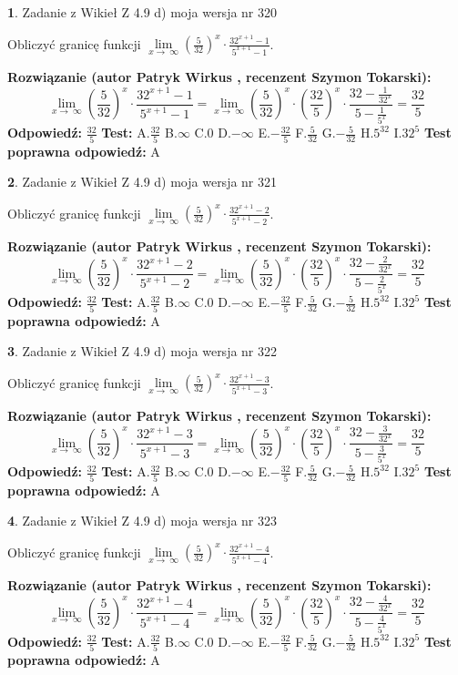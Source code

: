 \documentclass[12pt, a4paper]{article}
\theoremstyle{definition} %
\newtheorem{zad}{}
\newcommand{\zadStart}[1]{\begin{zad}#1\newline}
\newcommand{\zadStop}{\end{zad}}
\newcommand{\rozwStart}[2]{\noindent \textbf{Rozwiązanie (autor #1 , recenzent #2): }\newline}
\newcommand{\rozwStop}{\newline}
\newcommand{\odpStart}{\noindent \textbf{Odpowiedź:}\newline}
\newcommand{\odpStop}{\newline}
\newcommand{\testStart}{\noindent \textbf{Test:}\newline}
\newcommand{\testStop}{\newline}
\newcommand{\kluczStart}{\noindent \textbf{Test poprawna odpowiedź:}\newline}
\newcommand{\kluczStop}{\newline}
\begin{document}
\zadStart{Zadanie z Wikieł Z 4.9 d) moja wersja nr 320}


Obliczyć granicę funkcji  $\lim\limits_{x\to\ \infty}(\frac{5}{32})^{x}\cdot\frac{32^{x+1}-1}{5^{x+1}-1}$.
\zadStop
\rozwStart{Patryk Wirkus}{Szymon Tokarski}
$$\lim\limits_{x\to\ \infty}(\frac{5}{32})^{x}\cdot\frac{32^{x+1}-1}{5^{x+1}-1}=\lim\limits_{x\to\ \infty}(\frac{5}{32})^{x}\cdot(\frac{32}{5})^{x} \cdot \frac{32-\frac{1}{32^{x}}}{5-\frac{1}{5^{x}}} = \frac{32}{5}$$
\rozwStop
\odpStart
$\frac{32}{5}$
\odpStop
\testStart
A.$\frac{32}{5}$ B.$\infty$ C.$0$ D.$-\infty$ E.$-\frac{32}{5}$
F.$\frac{5}{32}$ G.$-\frac{5}{32}$
H.$5^{32}$
I.$32^{5}$
\testStop
\kluczStart
A
\kluczStop



\zadStart{Zadanie z Wikieł Z 4.9 d) moja wersja nr 321}


Obliczyć granicę funkcji  $\lim\limits_{x\to\ \infty}(\frac{5}{32})^{x}\cdot\frac{32^{x+1}-2}{5^{x+1}-2}$.
\zadStop
\rozwStart{Patryk Wirkus}{Szymon Tokarski}
$$\lim\limits_{x\to\ \infty}(\frac{5}{32})^{x}\cdot\frac{32^{x+1}-2}{5^{x+1}-2}=\lim\limits_{x\to\ \infty}(\frac{5}{32})^{x}\cdot(\frac{32}{5})^{x} \cdot \frac{32-\frac{2}{32^{x}}}{5-\frac{2}{5^{x}}} = \frac{32}{5}$$
\rozwStop
\odpStart
$\frac{32}{5}$
\odpStop
\testStart
A.$\frac{32}{5}$ B.$\infty$ C.$0$ D.$-\infty$ E.$-\frac{32}{5}$
F.$\frac{5}{32}$ G.$-\frac{5}{32}$
H.$5^{32}$
I.$32^{5}$
\testStop
\kluczStart
A
\kluczStop



\zadStart{Zadanie z Wikieł Z 4.9 d) moja wersja nr 322}


Obliczyć granicę funkcji  $\lim\limits_{x\to\ \infty}(\frac{5}{32})^{x}\cdot\frac{32^{x+1}-3}{5^{x+1}-3}$.
\zadStop
\rozwStart{Patryk Wirkus}{Szymon Tokarski}
$$\lim\limits_{x\to\ \infty}(\frac{5}{32})^{x}\cdot\frac{32^{x+1}-3}{5^{x+1}-3}=\lim\limits_{x\to\ \infty}(\frac{5}{32})^{x}\cdot(\frac{32}{5})^{x} \cdot \frac{32-\frac{3}{32^{x}}}{5-\frac{3}{5^{x}}} = \frac{32}{5}$$
\rozwStop
\odpStart
$\frac{32}{5}$
\odpStop
\testStart
A.$\frac{32}{5}$ B.$\infty$ C.$0$ D.$-\infty$ E.$-\frac{32}{5}$
F.$\frac{5}{32}$ G.$-\frac{5}{32}$
H.$5^{32}$
I.$32^{5}$
\testStop
\kluczStart
A
\kluczStop



\zadStart{Zadanie z Wikieł Z 4.9 d) moja wersja nr 323}


Obliczyć granicę funkcji  $\lim\limits_{x\to\ \infty}(\frac{5}{32})^{x}\cdot\frac{32^{x+1}-4}{5^{x+1}-4}$.
\zadStop
\rozwStart{Patryk Wirkus}{Szymon Tokarski}
$$\lim\limits_{x\to\ \infty}(\frac{5}{32})^{x}\cdot\frac{32^{x+1}-4}{5^{x+1}-4}=\lim\limits_{x\to\ \infty}(\frac{5}{32})^{x}\cdot(\frac{32}{5})^{x} \cdot \frac{32-\frac{4}{32^{x}}}{5-\frac{4}{5^{x}}} = \frac{32}{5}$$
\rozwStop
\odpStart
$\frac{32}{5}$
\odpStop
\testStart
A.$\frac{32}{5}$ B.$\infty$ C.$0$ D.$-\infty$ E.$-\frac{32}{5}$
F.$\frac{5}{32}$ G.$-\frac{5}{32}$
H.$5^{32}$
I.$32^{5}$
\testStop
\kluczStart
A
\kluczStop
\end{document}
